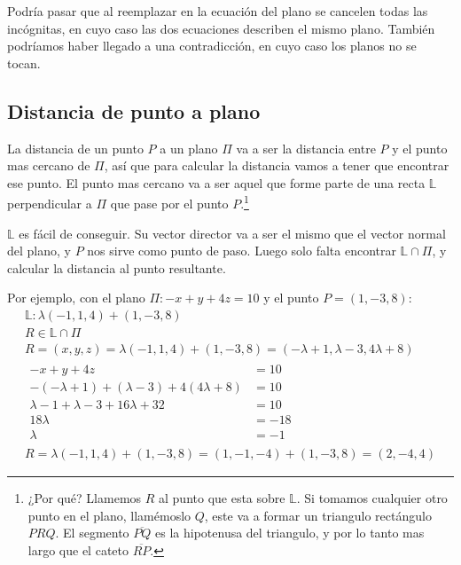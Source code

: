 \documentclass[../teoria.root.tex]{subfiles}
\begin{document}
Podría pasar que al reemplazar en la ecuación del plano se cancelen todas las
incógnitas, en cuyo caso las dos ecuaciones describen el mismo plano. También
podríamos haber llegado a una contradicción, en cuyo caso los planos no se
tocan.

\subsection{Distancia de punto a plano}

La distancia de un punto $P$ a un plano $\Pi$ va a ser la distancia entre $P$ y
el punto mas cercano de $\Pi$, así que para calcular la distancia vamos a tener
que encontrar ese punto. El punto mas cercano va a ser aquel que forme parte de
una recta $\mathbb{L}$ perpendicular a $\Pi$ que pase por el punto
$P$.\footnote{¿Por qué? Llamemos $R$ al punto que esta sobre $\mathbb{L}$. Si
tomamos cualquier otro punto en el plano, llamémoslo $Q$, este va a formar un
triangulo rectángulo $PRQ$. El segmento $\overline{PQ}$ es la hipotenusa del
triangulo, y por lo tanto mas largo que el cateto $\overline{RP}$.}

$\mathbb{L}$ es fácil de conseguir. Su vector director va a ser el mismo que el
vector normal del plano, y $P$ nos sirve como punto de paso. Luego solo falta
encontrar $\mathbb{L}\cap\Pi$, y calcular la distancia al punto resultante.

Por ejemplo, con el plano $\Pi:-x+y+4z=10$ y el punto $P=(1,-3,8)$:
\begin{gather*}
	\mathbb{L}:\lambda(-1,1,4)+(1,-3,8)\\
	R\in\mathbb{L}\cap\Pi\\
	R=(x,y,z)=\lambda(-1,1,4)+(1,-3,8)=(-\lambda+1,\lambda-3,4\lambda+8)\\
	\begin{align*}
		-x+y+4z&=10\\
		-(-\lambda+1)+(\lambda-3)+4(4\lambda+8)&=10\\
		\lambda-1+\lambda-3+16\lambda+32&=10\\
		18\lambda&=-18\\
		\lambda&=-1
	\end{align*}\\
	R=\lambda(-1,1,4)+(1,-3,8)=(1,-1,-4)+(1,-3,8)=(2,-4,4)
\end{gather*}
\end{document}
